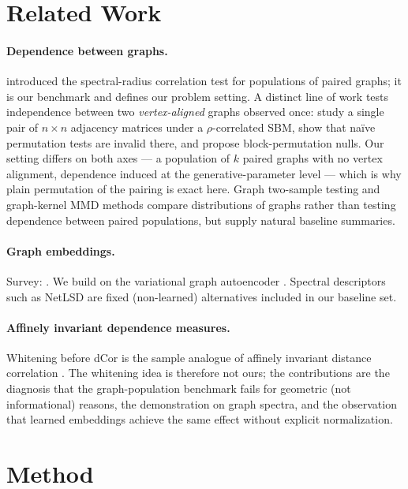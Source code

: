 \documentclass[11pt]{article}
\begin{document}
\section{Related Work}\label{sec:related}

\paragraph{Dependence between graphs.} \citet{fujita2017correlation}
introduced the spectral-radius correlation test for populations of paired
graphs; it is our benchmark and defines our problem setting. A distinct line of
work tests independence between two \emph{vertex-aligned} graphs observed
once: \citet{xiong2019graphindep} study a single pair of $n \times n$
adjacency matrices under a $\rho$-correlated SBM, show that na\"ive
permutation tests are invalid there, and propose block-permutation nulls. Our
setting differs on both axes --- a population of $k$ paired graphs with no
vertex alignment, dependence induced at the generative-parameter level ---
which is why plain permutation of the pairing is exact here. Graph two-sample
testing and graph-kernel MMD methods \citep{gretton2012kernel} compare
distributions of graphs rather than testing dependence between paired
populations, but supply natural baseline summaries.

\paragraph{Graph embeddings.} Survey: \citet{cai2018survey}. We build on the
variational graph autoencoder \citep{kipf2016variational}. Spectral
descriptors such as NetLSD \citep{tsitsulin2018netlsd} are fixed (non-learned)
alternatives included in our baseline set.

\paragraph{Affinely invariant dependence measures.} Whitening before dCor is
the sample analogue of affinely invariant distance correlation
\citep{dueck2014affinely}. The whitening idea is therefore not ours; the
contributions are the diagnosis that the graph-population benchmark fails for
geometric (not informational) reasons, the demonstration on graph spectra, and
the observation that learned embeddings achieve the same effect without
explicit normalization.

\section{Method}\label{sec:method}
\end{document}
